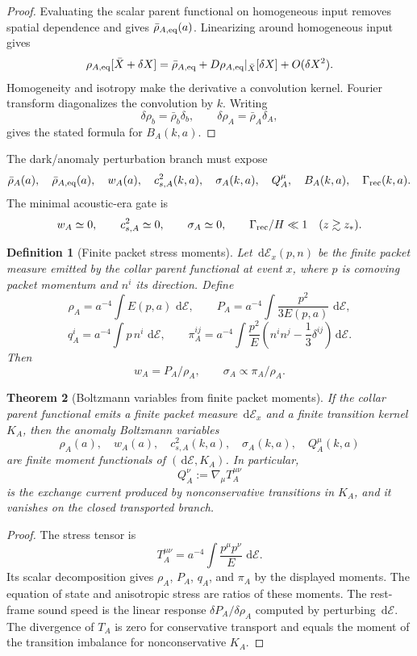 \documentclass[11pt]{article}
\newtheorem{theorem}{Theorem}[section]
\newtheorem{definition}[theorem]{Definition}
\newcommand{\dd}{\,\mathrm d}
\begin{document}
\begin{proof}
Evaluating the scalar parent functional on homogeneous input removes spatial dependence and gives
\(\bar\rho_{A,\rm eq}(a)\). Linearizing around homogeneous input gives
\[
\rho_{A,\rm eq}[\bar X+\delta X]
=
\bar\rho_{A,\rm eq}
+
D\rho_{A,\rm eq}|_{\bar X}[\delta X]
+
O(\delta X^2).
\]
Homogeneity and isotropy make the derivative a convolution kernel. Fourier transform diagonalizes
the convolution by \(k\). Writing
\[
\delta\rho_b=\bar\rho_b\delta_b,
\qquad
\delta\rho_A=\bar\rho_A\delta_A,
\]
gives the stated formula for \(B_A(k,a)\).
\end{proof}

The dark/anomaly perturbation branch must expose
\[
\bar\rho_A(a),\quad
\bar\rho_{A,\rm eq}(a),\quad
w_A(a),\quad
c_{s,A}^2(k,a),\quad
\sigma_A(k,a),\quad
Q_A^\mu,\quad
B_A(k,a),\quad
\Gamma_{\rm rec}(k,a).
\]
The minimal acoustic-era gate is
\[
w_A\simeq0,\qquad
c_{s,A}^2\simeq0,\qquad
\sigma_A\simeq0,\qquad
\Gamma_{\rm rec}/H\ll1
\quad(z\gtrsim z_\ast).
\]

\begin{definition}[Finite packet stress moments]\label{def:finite-packet-stress-moments}
Let \(\dd\mathcal E_x(p,n)\) be the finite packet measure emitted by the collar parent functional
at event \(x\), where \(p\) is comoving packet momentum and \(n^i\) its direction. Define
\[
\rho_A
=
a^{-4}\int E(p,a)\,\dd\mathcal E,
\qquad
P_A
=
a^{-4}\int \frac{p^2}{3E(p,a)}\,\dd\mathcal E,
\]
\[
q_A^i
=
a^{-4}\int p\,n^i\,\dd\mathcal E,
\qquad
\pi_A^{ij}
=
a^{-4}\int
\frac{p^2}{E}
\left(n^in^j-\frac13\delta^{ij}\right)
\dd\mathcal E.
\]
Then
\[
w_A=P_A/\rho_A,
\qquad
\sigma_A\propto\pi_A/\rho_A.
\]
\end{definition}

\begin{theorem}[Boltzmann variables from finite packet moments]\label{thm:packet-moment-boltzmann}
If the collar parent functional emits a finite packet measure \(\dd\mathcal E_x\) and a finite
transition kernel \(K_A\), then the anomaly Boltzmann variables
\[
\rho_A(a),
\quad
w_A(a),
\quad
c_{s,A}^2(k,a),
\quad
\sigma_A(k,a),
\quad
Q_A^\mu(k,a)
\]
are finite moment functionals of \((\dd\mathcal E,K_A)\). In particular,
\[
Q_A^\nu:=\nabla_\mu T_A^{\mu\nu}
\]
is the exchange current produced by nonconservative transitions in \(K_A\), and it vanishes on the
closed transported branch.
\end{theorem}

\begin{proof}
The stress tensor is
\[
T_A^{\mu\nu}
=
a^{-4}
\int
\frac{p^\mu p^\nu}{E}
\,\dd\mathcal E.
\]
Its scalar decomposition gives \(\rho_A\), \(P_A\), \(q_A\), and \(\pi_A\) by the displayed
moments. The equation of state and anisotropic stress are ratios of these moments. The rest-frame
sound speed is the linear response \(\delta P_A/\delta\rho_A\) computed by perturbing
\(\dd\mathcal E\). The divergence of \(T_A\) is zero for conservative transport and equals the
moment of the transition imbalance for nonconservative \(K_A\).
\end{proof}
\end{document}
